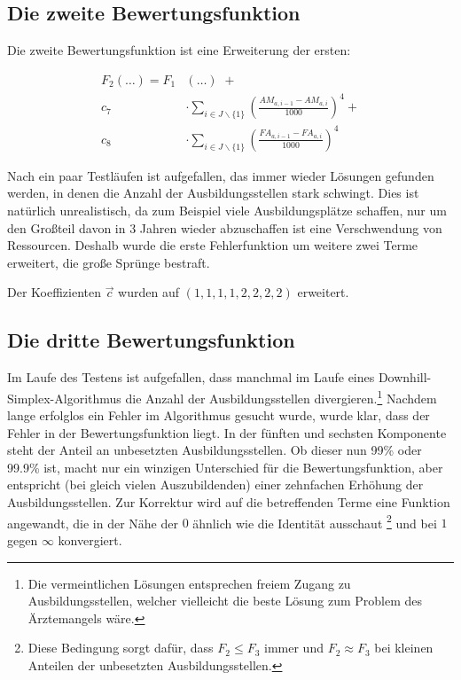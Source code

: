 \documentclass[a4paper,12pt]{article}
\begin{document}
\subsection{Die zweite Bewertungsfunktion}

Die zweite Bewertungsfunktion ist eine Erweiterung der ersten:

\begin{align*}
F_2(\hdots) =	F_1&(\hdots) \hspace{4pt} + \\
			c_7 &\cdot \sum\limits_{i\in J\backslash\{1\}} \left( \frac{AM_{a,i-1} - AM_{a,i} }{1000} \right) ^ 4 + \\
			c_8 &\cdot \sum\limits_{i\in J\backslash\{1\}} \left( \frac{FA_{a,i-1} - FA_{a,i} }{1000} \right) ^ 4
\end{align*}

Nach ein paar Testläufen ist aufgefallen, das immer wieder Lösungen gefunden werden, in denen die Anzahl der Ausbildungsstellen stark schwingt. Dies ist natürlich unrealistisch, da zum Beispiel viele Ausbildungsplätze schaffen, nur um den Großteil davon in 3 Jahren wieder abzuschaffen ist eine Verschwendung von Ressourcen. Deshalb wurde die erste Fehlerfunktion um weitere zwei Terme erweitert, die große Sprünge bestraft. 

Der Koeffizienten $\vec c$ wurden auf $(1,1,1,1,2,2,2,2)$ erweitert. 

\subsection{Die dritte Bewertungsfunktion}

Im Laufe des Testens ist aufgefallen, dass manchmal im Laufe eines Downhill-Simplex-Algorithmus die Anzahl der Ausbildungsstellen divergieren.\footnote{Die vermeintlichen Lösungen entsprechen freiem Zugang zu Ausbildungsstellen, welcher vielleicht die beste Lösung zum Problem des Ärztemangels wäre.} Nachdem lange erfolglos ein Fehler im Algorithmus gesucht wurde, wurde klar, dass der Fehler in der Bewertungsfunktion liegt. In der fünften und sechsten Komponente steht der Anteil an unbesetzten Ausbildungsstellen. Ob dieser nun 99\% oder 99.9\% ist, macht nur ein winzigen Unterschied für die Bewertungsfunktion,  aber entspricht (bei gleich vielen Auszubildenden) einer zehnfachen Erhöhung der Ausbildungsstellen. Zur Korrektur wird auf die betreffenden Terme eine Funktion angewandt, die in der Nähe der $0$ ähnlich wie die Identität ausschaut \footnote{Diese Bedingung sorgt dafür, dass $F_2 \leq F_3$ immer und $F_2 \approx F_3$ bei kleinen Anteilen der unbesetzten Ausbildungsstellen.} und bei $1$ gegen $\infty$ konvergiert.
\end{document}
